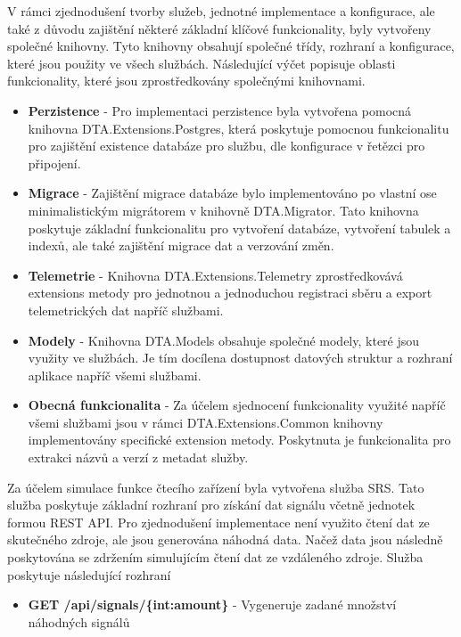 
V rámci zjednodušení tvorby služeb, jednotné implementace a konfigurace, ale také z důvodu zajištění některé základní klíčové funkcionality, byly vytvořeny společné knihovny. Tyto knihovny obsahují společné třídy, rozhraní a konfigurace, které jsou použity ve všech službách. Následující výčet popisuje oblasti funkcionality, které jsou zprostředkovány společnými knihovnami.

\begin{itemize}
  \item \textbf{Perzistence} - Pro implementaci perzistence byla vytvořena pomocná knihovna DTA.Extensions.Postgres, která poskytuje pomocnou funkcionalitu pro zajištění existence databáze pro službu, dle konfigurace v řetězci pro připojení.
  \item \textbf{Migrace} - Zajištění migrace databáze bylo implementováno po vlastní ose minimalistickým migrátorem v knihovně DTA.Migrator. Tato knihovna poskytuje základní funkcionalitu pro vytvoření databáze, vytvoření tabulek a indexů, ale také zajištění migrace dat a verzování změn.
  \item \textbf{Telemetrie} - Knihovna DTA.Extensions.Telemetry zprostředkovává extensions metody pro jednotnou a jednoduchou registraci sběru a export telemetrických dat napříč službami.
  \item \textbf{Modely} - Knihovna DTA.Models obsahuje společné modely, které jsou využity ve službách. Je tím docílena dostupnost datových struktur a rozhraní aplikace napříč všemi službami.
  \item \textbf{Obecná funkcionalita} - Za účelem sjednocení funkcionality využité napříč všemi službami jsou v rámci DTA.Extensions.Common knihovny implementovány specifické extension metody. Poskytnuta je funkcionalita pro extrakci názvů a verzí z metadat služby.
\end{itemize}


Za účelem simulace funkce čtecího zařízení byla vytvořena služba SRS. Tato služba poskytuje základní rozhraní pro získání dat signálu včetně jednotek formou REST API. Pro zjednodušení implementace není využito čtení dat ze skutečného zdroje, ale jsou generována náhodná data. Načež data jsou následně poskytována se zdržením simulujícím čtení dat ze vzdáleného zdroje. Služba poskytuje následující rozhraní

\begin{itemize}
    \item \textbf{GET /api/signals/\{int:amount\}} - Vygeneruje zadané množství náhodných signálů
\end{itemize}

